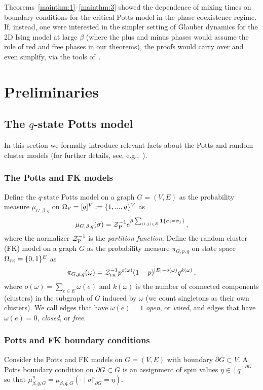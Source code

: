\documentclass[reqno,11pt]{amsart}
\numberwithin{equation}{section}
\renewcommand{\restriction}{\mathord{\upharpoonright}}
\theoremstyle{definition}{
\newtheorem{example}[theorem]{Example}
\newtheorem{definition}[theorem]{Definition}
\newtheorem*{definition*}{Definition}
\newtheorem{problem}[theorem]{Problem}
\newtheorem{question}[theorem]{Question}
\newtheorem{remark}[theorem]{Remark}
}
\newcommand{\rc}{{\textsc{fk}}}
\begin{document}
\begin{remark}
Theorems~\ref{mainthm:1}--\ref{mainthm:3} showed the dependence of mixing times on boundary conditions for the critical Potts model in the phase coexistence regime. If, instead, one were  interested in the simpler setting of  Glauber dynamics for the 2D Ising model at large  $\beta$ (where the plus and minus phases would assume the role of red and free phases in our theorems), the proofs would carry over and even simplify, via the tools of~\cite{DKS}. 
\end{remark}

\section{Preliminaries}\label{sec:preliminaries}

\subsection{The $q$-state Potts model}\label{sub:potts} In this section we formally introduce relevant facts about the Potts and random cluster models (for further details, see, e.g.,~\cite{Gr04}).

\subsubsection*{The Potts and FK models}
Define the $q$-state Potts model on a graph $G=(V,E)$ as the probability measure $\mu_{G,\beta,q}$ on $\Omega_{\textsc P}=[q]^V:= \{1,...,q\}^V$ as
\[\mu_{G,\beta,q} (\sigma)=\mathcal Z_{\textsc P}^{-1} e^{ \beta \sum_{(i,j)\in E} \boldsymbol 1\{\sigma_i=\sigma_j\}}\,,
\]
where the normalizer $\mathcal Z_{\textsc P}^{-1}$ is the \emph{partition function}.
%
Define the random cluster (FK) model on a graph $G$ as the probability measure $\pi_{G,p,q}$ on state space $\Omega_{\rc}=\{0,1\}^E$ as
\[\pi_{G,p,q}(\omega) = \mathcal Z^{-1}_{\rc} p^{o(\omega)}(1-p)^{|E|-o(\omega)} q^{k(\omega)}\,,
\]
where $o(\omega)=\sum_{e\in E} \omega(e)$ and $k(\omega)$ is the number of connected components (clusters) in the subgraph of $G$ induced by $\omega$ (we count singletons as their own clusters). We call edges that have $\omega(e)=1$ \emph{open}, or \emph{wired}, and edges that have $\omega(e)=0$, \emph{closed}, or \emph{free}.

\subsubsection*{Potts and FK boundary conditions}
Consider the Potts and FK models on $G=(V,E)$ with boundary $\partial G\subset V$. A Potts boundary condition on $\partial G\subset G$ is an assignment of spin values $\eta \in [q]^{\partial G}$ so that $\mu^\eta_{\beta,q,G}=\mu_{\beta,q,G}(\cdot \mid \sigma\restriction_{\partial G}=\eta)$. 
\end{document}
